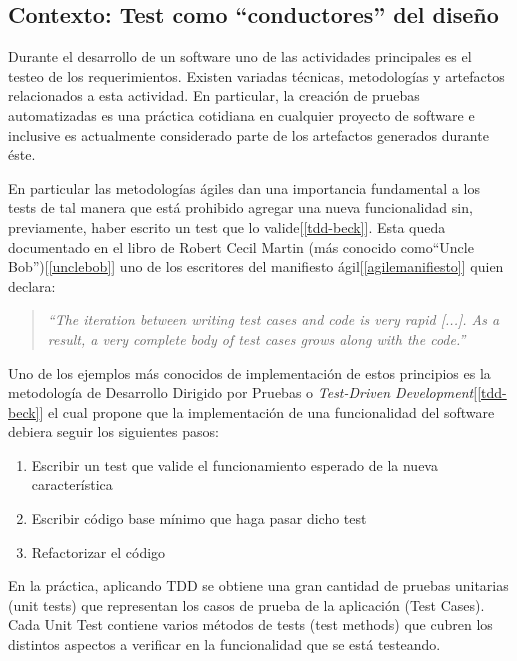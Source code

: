\documentclass[12pt,spanish,letterpaper]{article}
\begin{document}
\subsection{Contexto: Test como ``conductores'' del diseño}
\par Durante el desarrollo de un software uno de las actividades principales es el testeo de los requerimientos. Existen variadas técnicas, metodologías y artefactos relacionados a esta actividad. En particular, la creación de pruebas automatizadas es una práctica cotidiana en cualquier proyecto de software e inclusive es actualmente considerado parte de los artefactos generados durante éste. \\

\par En particular las metodologías ágiles dan una importancia fundamental a los tests de tal manera que está prohibido agregar una nueva funcionalidad sin, previamente, haber escrito un test que lo valide[\ref{tdd-beck}]. Esta queda documentado en el libro de Robert Cecil Martin (más conocido como``Uncle Bob'')[\ref{unclebob}] uno de los escritores del manifiesto ágil[\ref{agilemanifiesto}] quien declara:

\begin{quote}
\emph{``The iteration between writing test cases and code is very rapid [...]. As a result, a very complete body of test cases grows along with the code.''}
\end{quote}

\par Uno de los ejemplos más conocidos de implementación de estos principios es la metodología de Desarrollo Dirigido por Pruebas o \emph{Test-Driven Development}[\ref{tdd-beck}] el cual propone que la implementación de una funcionalidad del software debiera seguir los siguientes pasos:\\

\begin{enumerate}
\item Escribir un test que valide el funcionamiento esperado de la nueva característica
\item Escribir código base mínimo que haga pasar dicho test
\item Refactorizar el código
\end{enumerate}

\par En la práctica, aplicando TDD se obtiene una gran cantidad de pruebas unitarias (unit tests) que representan los casos de prueba de la aplicación (Test Cases). Cada Unit Test contiene varios métodos de tests (test methods) que cubren los distintos aspectos a verificar en la funcionalidad que se está testeando.
\end{document}
